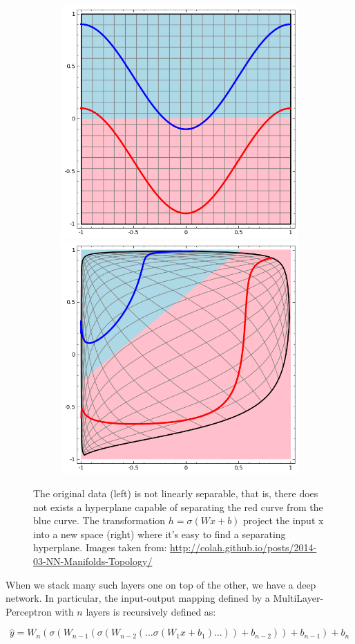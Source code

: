 \documentclass[../main.tex]{subfiles}
\begin{document}
    \begin{figure}[h!]
        \centering
        \begin{subfigure}{\linewidth}
            \centering
        	\includegraphics[width=.5\linewidth]{img/non-linearly-separable.png}\label{fig:nonlinearsep}\hfill
        	\includegraphics[width=.5\linewidth]{img/linearly-separable.png}\label{fig:linearsep}
        \end{subfigure}
        \caption{The original data (left) is not linearly separable, that is, there does not exists a hyperplane capable of
            separating the red curve from the blue curve. The transformation $h = \sigma(Wx + b)$ project the input x into a new space
        (right) where it's easy to find a separating hyperplane. Images taken from: \url{http://colah.github.io/posts/2014-03-NN-Manifolds-Topology/}}\label{fig:linear-layer-viz}
	\end{figure}

    When we stack many such layers one on top of the other, we have a deep network. In particular, the input-output mapping defined by
    a MultiLayer-Perceptron with $n$ layers is recursively defined as:

    \begin{equation}
        \hat{y} = W_{n}(\sigma(W_{n-1}(\sigma(W_{n-2}(\ldots \sigma(W_{1} x + b_{1}) \ldots)) + b_{n-2})) + b_{n-1}) + b_{n} 
    \end{equation}
\end{document}
